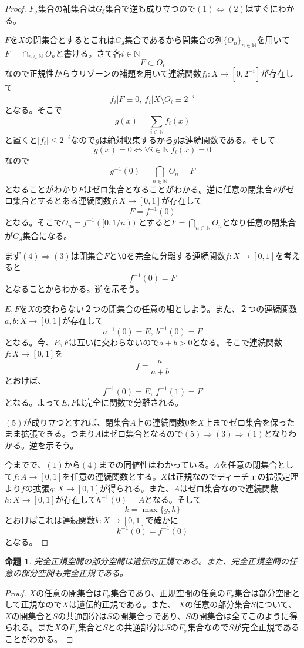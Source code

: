\documentclass[leqno]{jsarticle}
\newtheorem{prop}[thm]{命題}
\newcommand{\To}{\Longrightarrow}
\newcommand{\nn}{\mathbb{N}}
\begin{document}
\begin{proof}
$F_{\sigma}$集合の補集合は$G_{\delta}$集合で逆も成り立つので$(1)\iff(2)$はすぐにわかる。\par
[$(2)\iff (3)$]\par
$F$を$X$の閉集合とするとこれは$G_{\delta}$集合であるから開集合の列$\{O_n\}_{n\in \nn}を用いて$$F=\cap_{n\in \nn}O_n$と書ける。さて各$i\in \nn$
\[
F\subset O_i
\]
なので正規性からウリゾーンの補題を用いて連続関数$f_i:X\to [0,2^{-i}]$が存在して
\[
f_{i}|F\equiv0,\ f_i|X\setminus O_i\equiv  2^{-i}
\]
となる。そこで
\[
g(x)=\sum_{i\in \nn}f_i(x)
\]
と置くと$|f_i|\le 2^{-i}$なので$g$は絶対収束するから$g$は連続関数である。そして
\[
g(x)=0\iff \forall i\in \nn\ f_i(x)=0
\]
なので
\[
g^{-1}(0)=\bigcap_{n\in \nn}O_n=F
\]
となることがわかり$F$はゼロ集合となることがわかる。逆に任意の閉集合$F$がゼロ集合とするとある連続関数$f:X\to [0,1]$が存在して
\[
F=f^{-1}(0)
\]
となる。そこで$O_n=f^{-1}([0,1/n))$
とすると$F=\bigcap_{n\in \nn}O_n$となり任意の閉集合が$G_{\delta}$集合になる。\par
[$(2)\iff (3)$の証明終わり]\par
[$(3)\iff (4)$]\par
まず$(4)\To(3)$は閉集合$F$と$\O$を完全に分離する連続関数$f:X\to [0,1]$を考えると
\[
f^{-1}(0)=F
\]
となることからわかる。逆を示そう。\par
$E,F$を$X$の交わらない２つの閉集合の任意の組としよう。また、２つの連続関数$a,b:X\to [0,1]$が存在して
\[
a^{-1}(0)=E,\ b^{-1}(0)=F
\]
となる。今、$E,F$は互いに交わらないので$a+b>0$となる。そこで連続関数$f:X\to[0,1]$を
\[
f=\frac{a}{a+b}
\]
とおけば、
\[
f^{-1}(0)=E,\ f^{-1}(1)=F
\]
となる。よって$E,F$は完全に関数で分離される。\par
[$(3)\iff (4)$の証明終わり]\par
[$(5)\iff (1)$]\par
$(5)$が成り立つとすれば、閉集合$A$上の連続関数$0$を$X$上までゼロ集合を保ったまま拡張できる。つまり$A$はゼロ集合となるので$(5)\To (3)\To(1)$となりわかる。逆を示そう。\par
今までで、$(1)$から$(4)$までの同値性はわかっている。$A$を任意の閉集合として$f:A\to [0,1]$を任意の連続関数とする。$X$は正規なのでティーチェの拡張定理より$f$の拡張$g:X\to[0,1]$が得られる。また、$A$はゼロ集合なので連続関数$h:X\to[0,1]$が存在して$h^{-1}(0)=A$となる。そして
\[
k=\max\{g,h\}
\]
とおけばこれは連続関数$k:X\to[0,1]$で確かに
\[
k^{-1}(0)=f^{-1}(0)
\]
となる。\par
[$(5)\iff (1)$の証明終わり]\par
\end{proof}
\begin{prop}
完全正規空間の部分空間は遺伝的正規である。また、完全正規空間の任意の部分空間も完全正規である。
\end{prop}
\begin{proof}
$X$の任意の開集合は$F_{\sigma}$集合であり、正規空間の任意の$F_{\sigma}$集合は部分空間として正規なので$X$は遺伝的正規である。また、
$X$の任意の部分集合$S$について、$X$の開集合と$S$の共通部分は$S$の開集合っであり、$S$の開集合は全てこのように得られる。また$X$の$F_{\sigma}$集合と$S$との共通部分は$S$の$F_{\sigma}$集合なので$S$が完全正規であることがわかる。
\end{proof}
\end{document}
